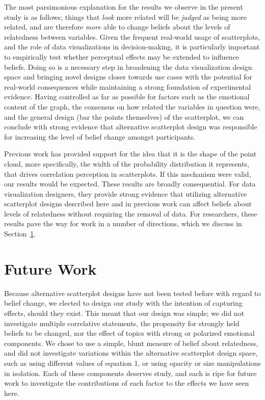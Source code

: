 \documentclass[manuscript,screen,review,anonymous]{acmart}
\begin{document}
The most parsimonious explanation for the results we observe in the
present study is as follows; things that \emph{look} more related will
be \emph{judged} as being more related, and are therefore \emph{more}
able to change beliefs about the levels of relatedness between
variables. Given the frequent real-world usage of scatterplots, and the
role of data visualizations in decision-making, it is particularly
important to empirically test whether perceptual effects may be extended
to influence beliefs. Doing so is a necessary step in broadening the
data visualization design space and bringing novel designs closer
towards use cases with the potential for real-world consequences while
maintaining a strong foundation of experimental evidence. Having
controlled as far as possible for factors such as the emotional content
of the graph, the consensus on how related the variables in question
were, and the general design (bar the points themselves) of the
scatterplot, we can conclude with strong evidence that alternative
scatterplot design was responsible for increasing the level of belief
change amongst participants.

Previous work has provided support for the idea that it is the shape of
the point cloud, more specifically, the width of the probability
distribution it represents, that drives correlation perception in
scatterplots. If this mechanism were valid, our results would be
expected. These results are broadly consequential. For data
visualization designers, they provide strong evidence that utilizing
alternative scatterplot designs described here and in previous work can
affect beliefs about levels of relatedness without requiring the removal
of data. For researchers, these results pave the way for work in a
number of directions, which we discuss in Section~\ref{sec-future-work}.

\section{Future Work}\label{sec-future-work}

Because alternative scatterplot designs have not been tested before with
regard to belief change, we elected to design our study with the
intention of capturing effects, should they exist. This meant that our
design was simple; we did not investigate multiple correlative
statements, the propensity for strongly held beliefs to be changed, nor
the effect of topics with strong or polarized emotional components. We
chose to use a simple, blunt measure of belief about relatedness, and
did not investigate variations within the alternative scatterplot design
space, such as using different values of equation 1, or using opacity or
size manipulations in isolation. Each of these components deserves
study, and each is ripe for future work to investigate the contributions
of each factor to the effects we have seen here.
\end{document}
